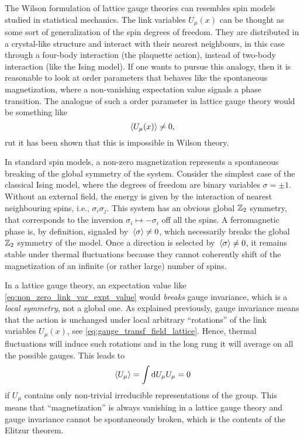 The Wilson formulation of lattice gauge theories can resembles spin models studied in statistical mechanics.
The link variables $U_{\mu}(x)$ can be thought as some sort of generalization of the spin degrees of freedom.
They are distributed in a crystal-like structure and interact with their nearest neighbours, in this case through a four-body interaction (the plaquette action), instead of two-body interaction (like the Ising model).
If one wants to pursue this analogy, then it is reasonable to look at order parameters that behaves like the spontaneous magnetization, where a non-vanishing expectation value signals a phase transition.
The analogue of such a order parameter in lattice gauge theory would be something like
\begin{equation}
    \ev*{U_{\mu}(x)} \neq 0,
    \label{eq:non_zero_link_var_expt_value}
\end{equation}
rut it has been shown\citneeded {} that this is impossible in Wilson theory.

In standard spin models, a non-zero magnetization represents a spontaneous breaking of the global symmetry of the system.
Consider the simplest case of the classical Ising model, where the degrees of freedom are binary variables $\sigma = \pm 1$.
Without an external field, the energy is given by the interaction of nearest neighbouring spins, i.e., $\sigma_i \sigma_j$.
This system has an obvious global $\mathbb{Z}_2$ symmetry, that corresponds to the inversion $\sigma_i \mapsto -\sigma_i$ off all the spins.
A ferromagnetic phase is, by definition, signaled by $\ev*{\sigma} \neq 0$, which necessarily breaks the global $\mathbb{Z}_2$ symmetry of the model.
Once a direction is selected by $\ev*{\sigma} \neq 0$, it remains stable under thermal fluctuations because they cannot coherently shift of the magnetization of an infinite (or rather large) number of spins.

In a lattice gauge theory, an expectation value like \eqref{eq:non_zero_link_var_expt_value} would \emph{breaks} gauge invariance, which is a \emph{local symmetry}, not a global one.
As explained previously, gauge invariance means that the action is unchanged under local arbitrary ``rotations'' of the link variables $U_{\mu}(x)$, see \eqref{eq:gauge_transf_field_lattice}.
Hence, thermal fluctuations will induce such rotations and in the long rung it will average on all the possible gauges.
This leads to
\begin{equation}
    \ev*{U_{\mu}} = \int \dd U_{\mu} U_{\mu} = 0
\end{equation}
if $U_{\mu}$ contains only non-trivial irreducible representations of the group.
This means that ``magnetization'' is always vanishing in a lattice gauge theory and gauge invariance cannot be spontaneously broken, which is the contents of the Elitzur theorem\citneeded.

